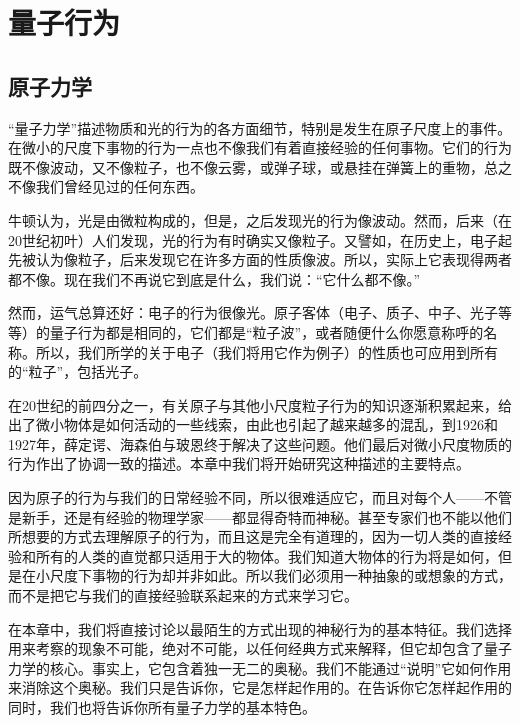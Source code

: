 \chapter{量子行为}

\section{原子力学}

“量子力学”描述物质和光的行为的各方面细节，特别是发生在原子尺度上的事件。在微小的尺度下事物的行为一点也不像我们有着直接经验的任何事物。它们的行为既不像波动，又不像粒子，也不像云雾，或弹子球，或悬挂在弹簧上的重物，总之不像我们曾经见过的任何东西。

牛顿认为，光是由微粒构成的，但是，之后发现光的行为像波动。然而，后来（在20世纪初叶）人们发现，光的行为有时确实又像粒子。又譬如，在历史上，电子起先被认为像粒子，后来发现它在许多方面的性质像波。所以，实际上它表现得两者都不像。现在我们不再说它到底是什么，我们说：“它什么都不像。”

然而，运气总算还好：电子的行为很像光。原子客体（电子、质子、中子、光子等等）的量子行为都是相同的，它们都是“粒子波”，或者随便什么你愿意称呼的名称。所以，我们所学的关于电子（我们将用它作为例子）的性质也可应用到所有的“粒子”，包括光子。

在20世纪的前四分之一，有关原子与其他小尺度粒子行为的知识逐渐积累起来，给出了微小物体是如何活动的一些线索，由此也引起了越来越多的混乱，到1926和1927年，薛定谔、海森伯与玻恩终于解决了这些问题。他们最后对微小尺度物质的行为作出了协调一致的描述。本章中我们将开始研究这种描述的主要特点。

因为原子的行为与我们的日常经验不同，所以很难适应它，而且对每个人——不管是新手，还是有经验的物理学家——都显得奇特而神秘。甚至专家们也不能以他们所想要的方式去理解原子的行为，而且这是完全有道理的，因为一切人类的直接经验和所有的人类的直觉都只适用于大的物体。我们知道大物体的行为将是如何，但是在小尺度下事物的行为却并非如此。所以我们必须用一种抽象的或想象的方式，而不是把它与我们的直接经验联系起来的方式来学习它。

在本章中，我们将直接讨论以最陌生的方式出现的神秘行为的基本特征。我们选择用来考察的现象不可能，绝对不可能，以任何经典方式来解释，但它却包含了量子力学的核心。事实上，它包含着独一无二的奥秘。我们不能通过“说明”它如何作用来消除这个奥秘。我们只是告诉你，它是怎样起作用的。在告诉你它怎样起作用的同时，我们也将告诉你所有量子力学的基本特色。
